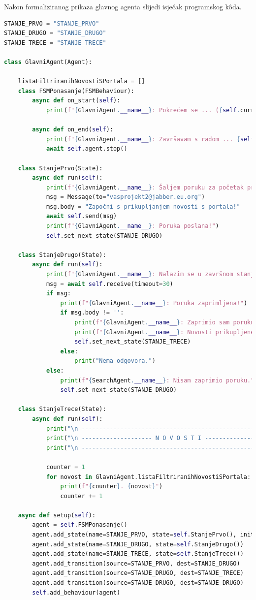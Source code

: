 \documentclass[]{foi} %
\begin{document}
Nakon formaliziranog prikaza glavnog agenta slijedi isječak programskog kôda.
\begin{lstlisting}[language=Python, caption={Programski kôd za GlavniAgent agenta}]
STANJE_PRVO = "STANJE_PRVO"
STANJE_DRUGO = "STANJE_DRUGO"
STANJE_TRECE = "STANJE_TRECE"

class GlavniAgent(Agent):

    listaFiltriranihNovostiSPortala = []
    class FSMPonasanje(FSMBehaviour):
        async def on_start(self):
            print(f"{GlavniAgent.__name__}: Pokrećem se ... ({self.current_state})")

        async def on_end(self):
            print(f"{GlavniAgent.__name__}: Završavam s radom ... {self.current_state}")
            await self.agent.stop()

    class StanjePrvo(State):
        async def run(self):
            print(f"{GlavniAgent.__name__}: Šaljem poruku za početak prikupljanje novosti s portala ...")
            msg = Message(to="vasprojekt2@jabber.eu.org")
            msg.body = "Započni s prikupljanjem novosti s portala!"
            await self.send(msg)
            print(f"{GlavniAgent.__name__}: Poruka poslana!")
            self.set_next_state(STANJE_DRUGO)

    class StanjeDrugo(State):
        async def run(self):
            print(f"{GlavniAgent.__name__}: Nalazim se u završnom stanju. Čekam na primitak poruke ...")
            msg = await self.receive(timeout=30)
            if msg:
                print(f"{GlavniAgent.__name__}: Poruka zaprimljena!")
                if msg.body != '':
                    print(f"{GlavniAgent.__name__}: Zaprimio sam poruku sljedećeg sadržaja: \"{msg.body}\"")
                    print(f"{GlavniAgent.__name__}: Novosti prikupljene i spremne za prikaz.")
                    self.set_next_state(STANJE_TRECE)
                else:
                    print("Nema odgovora.")
            else:
                print(f"{SearchAgent.__name__}: Nisam zaprimio poruku.")
                self.set_next_state(STANJE_DRUGO)

    class StanjeTrece(State):
        async def run(self):
            print("\n ------------------------------------------------------- \n")
            print("\n -------------------- N O V O S T I -------------------- \n")
            print("\n ------------------------------------------------------- \n")
            
            counter = 1
            for novost in GlavniAgent.listaFiltriranihNovostiSPortala:
                print(f"{counter}. {novost}")
                counter += 1
    
    async def setup(self):
        agent = self.FSMPonasanje()
        agent.add_state(name=STANJE_PRVO, state=self.StanjePrvo(), initial=True)
        agent.add_state(name=STANJE_DRUGO, state=self.StanjeDrugo())
        agent.add_state(name=STANJE_TRECE, state=self.StanjeTrece())
        agent.add_transition(source=STANJE_PRVO, dest=STANJE_DRUGO)
        agent.add_transition(source=STANJE_DRUGO, dest=STANJE_TRECE)
        agent.add_transition(source=STANJE_DRUGO, dest=STANJE_DRUGO)
        self.add_behaviour(agent)
\end{lstlisting}
\end{document}
